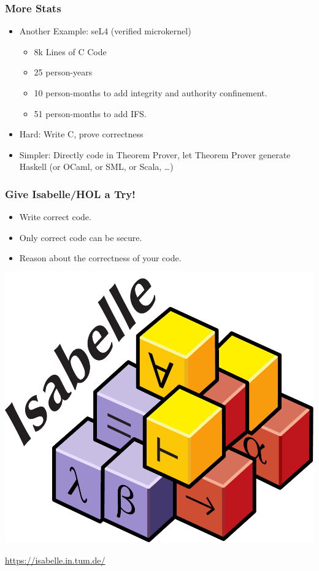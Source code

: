 \documentclass[aspectratio=169]{beamer}
\begin{document}
\begin{frame}
	\frametitle{More Stats}
	\begin{itemize}
		\item Another Example: seL4 (verified microkernel)
		\begin{itemize}
			\item 8k Lines of C Code
			\item 25 person-years
			\item<2-> 10 person-months to add integrity and authority confinement.
			\item<2-> 51 person-months to add IFS.
		\end{itemize}
		\item<3-> Hard: Write C, prove correctness
		\item<4-> Simpler: Directly code in Theorem Prover, let Theorem Prover generate Haskell (or OCaml, or SML, or Scala, \dots)
	\end{itemize}
\end{frame}


\begin{frame}
	\frametitle{Give Isabelle/HOL a Try!}
	\begin{itemize}
		\item Write correct code.
		\item Only correct code can be secure.
		\item Reason about the correctness of your code.
	\end{itemize}
	\medskip
	\begin{center}
		\includegraphics[scale=.4]{isabelle.pdf}
	\end{center}
	\url{https://isabelle.in.tum.de/}
\end{frame}
\end{document}
